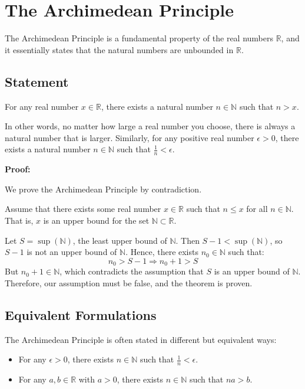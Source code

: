 \section{The Archimedean Principle}

The Archimedean Principle is a fundamental property of the real numbers \( \mathbb{R} \), and it essentially states that the natural numbers are unbounded in \( \mathbb{R} \).

\subsection{Statement}

For any real number \( x \in \mathbb{R} \), there exists a natural number \( n \in \mathbb{N} \) such that \( n > x \).

In other words, no matter how large a real number you choose, there is always a natural number that is larger. Similarly, for any positive real number \( \epsilon > 0 \), there exists a natural number \( n \in \mathbb{N} \) such that \( \frac{1}{n} < \epsilon \).

\textbf{Proof:}

We prove the Archimedean Principle by contradiction.

Assume that there exists some real number \( x \in \mathbb{R} \) such that \( n \leq x \) for all \( n \in \mathbb{N} \). That is, \( x \) is an upper bound for the set \( \mathbb{N} \subset \mathbb{R} \).

Let \( S = \sup(\mathbb{N}) \), the least upper bound of \( \mathbb{N} \). Then \( S - 1 < \sup(\mathbb{N}) \), so \( S - 1 \) is not an upper bound of \( \mathbb{N} \). Hence, there exists \( n_0 \in \mathbb{N} \) such that:
\[
	n_0 > S - 1 \Rightarrow n_0 + 1 > S
\]
But \( n_0 + 1 \in \mathbb{N} \), which contradicts the assumption that \( S \) is an upper bound of \( \mathbb{N} \). Therefore, our assumption must be false, and the theorem is proven.

\QED

\subsection{Equivalent Formulations}

The Archimedean Principle is often stated in different but equivalent ways:

\begin{itemize}[label=\(-\)]
	\item For any \( \epsilon > 0 \), there exists \( n \in \mathbb{N} \) such that \( \frac{1}{n} < \epsilon \).
	\item For any \( a, b \in \mathbb{R} \) with \( a > 0 \), there exists \( n \in \mathbb{N} \) such that \( na > b \).
\end{itemize}

